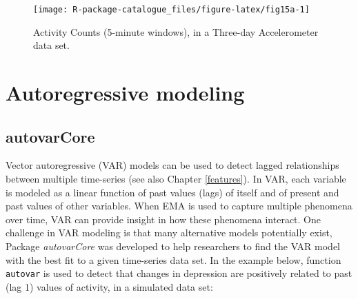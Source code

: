 \documentclass[]{book}
\begin{document}
\begin{figure}

{\centering \texttt{[image: R-package-catalogue\_files/figure-latex/fig15a-1]} 

}

\caption{Activity Counts (5-minute windows), in a Three-day Accelerometer data set.}\label{fig:fig15a}
\end{figure}

\section{Autoregressive modeling}\label{autoregressive-modeling}

\subsection{autovarCore}\label{autovarcore}

 


Vector autoregressive (VAR) models can be used to detect lagged
relationships between multiple time-series (see also Chapter
\ref{features}). In VAR, each variable is modeled as a linear function
of past values (lags) of itself and of present and past values of other
variables. When EMA is used to capture multiple phenomena over time, VAR
can provide insight in how these phenomena interact. One challenge in
VAR modeling is that many alternative models potentially exist, Package
\emph{autovarCore} \citep{R-autovarCore} was developed to help
researchers to find the VAR model with the best fit to a given
time-series data set. In the example below, function \texttt{autovar} is
used to detect that changes in depression are positively related to past
(lag 1) values of activity, in a simulated data set:
\end{document}
